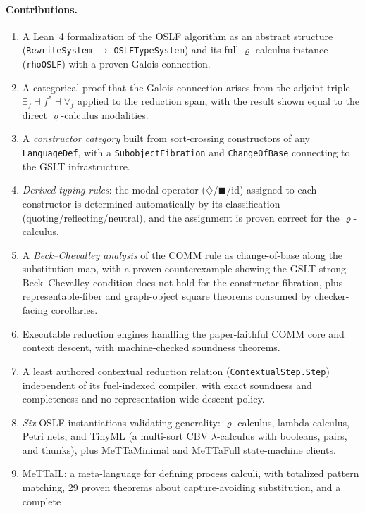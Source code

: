 \documentclass[]{article}
\newcommand{\code}[1]{\texttt{#1}}
\newcommand{\rhocalc}{\ensuremath{\varrho}}
\newcommand{\Dia}{\ensuremath{\diamondsuit}}
\newcommand{\Bx}{\ensuremath{\blacksquare}}
\newcommand{\OSLF}{\textup{OSLF}}
\newcommand{\MeTTaIL}{\textup{MeTTaIL}}
\begin{document}
\paragraph{Contributions.}
\begin{enumerate}
\item A Lean~4 formalization of the \OSLF{} algorithm as an abstract structure
  (\code{RewriteSystem} $\to$ \code{OSLFTypeSystem}) and its full \rhocalc{}-calculus
  instance (\code{rhoOSLF}) with a proven Galois connection.
\item A categorical proof that the Galois connection arises from the adjoint triple
  $\exists_f \dashv f^* \dashv \forall_f$ applied to the reduction span, with the
  result shown equal to the direct \rhocalc{}-calculus modalities.
\item A \emph{constructor category} built from sort-crossing constructors of any
  \code{LanguageDef}, with a \code{SubobjectFibration} and \code{ChangeOfBase}
  connecting to the GSLT infrastructure.
\item \emph{Derived typing rules}: the modal operator ($\Dia$/$\Bx$/id) assigned to
  each constructor is determined automatically by its classification
  (quoting/reflecting/neutral), and the assignment is proven correct for the
  \rhocalc{}-calculus.
\item A \emph{Beck--Chevalley analysis} of the COMM rule as change-of-base along the
  substitution map, with a proven counterexample showing the GSLT strong
  Beck--Chevalley condition does not hold for the constructor fibration, plus
  representable-fiber and graph-object square theorems consumed by checker-facing
  corollaries.
\item Executable reduction engines handling the paper-faithful COMM core and context descent, with
  machine-checked soundness theorems.
\item A least authored contextual reduction relation
  (\code{ContextualStep.Step}) independent of its fuel-indexed compiler, with
  exact soundness and completeness and no representation-wide descent policy.
\item \emph{Six} \OSLF{} instantiations validating generality:
  \rhocalc{}-calculus, lambda calculus, Petri nets, and TinyML (a multi-sort CBV
  $\lambda$-calculus with booleans, pairs, and thunks), plus MeTTaMinimal and
  MeTTaFull state-machine clients.
\item \MeTTaIL{}: a meta-language for defining process calculi, with totalized pattern
  matching, 29 proven theorems about capture-avoiding substitution, and a complete

\end{enumerate}
\end{document}
